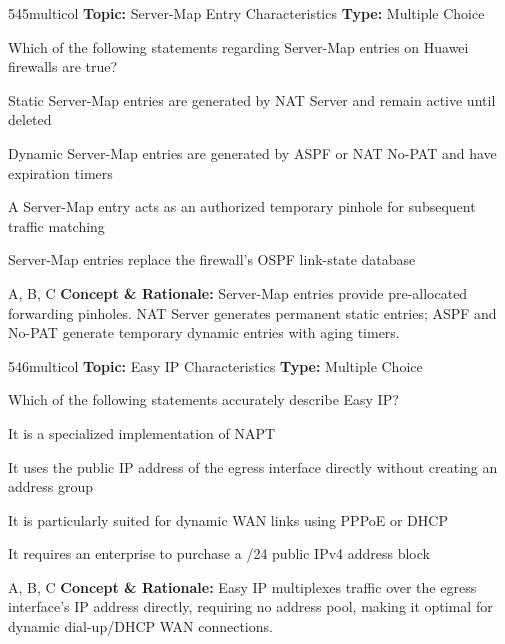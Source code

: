 \begin{qcard}{545}{multicol}
\textcolor{darkslate!75}{\small\textbf{Topic:} Server-Map Entry Characteristics \hfill \textbf{Type:} Multiple Choice}\vspace{0.4em}\par
Which of the following statements regarding Server-Map entries on Huawei firewalls are true?
\begin{qoptions}
\item Static Server-Map entries are generated by NAT Server and remain active until deleted
\item Dynamic Server-Map entries are generated by ASPF or NAT No-PAT and have expiration timers
\item A Server-Map entry acts as an authorized temporary pinhole for subsequent traffic matching
\item Server-Map entries replace the firewall's OSPF link-state database
\end{qoptions}
\end{qcard}
\nopagebreak
\begin{explainbox}{A, B, C}
\textbf{Concept \& Rationale:} Server-Map entries provide pre-allocated forwarding pinholes. NAT Server generates permanent static entries; ASPF and No-PAT generate temporary dynamic entries with aging timers.
\end{explainbox}

\begin{qcard}{546}{multicol}
\textcolor{darkslate!75}{\small\textbf{Topic:} Easy IP Characteristics \hfill \textbf{Type:} Multiple Choice}\vspace{0.4em}\par
Which of the following statements accurately describe Easy IP?
\begin{qoptions}
\item It is a specialized implementation of NAPT
\item It uses the public IP address of the egress interface directly without creating an address group
\item It is particularly suited for dynamic WAN links using PPPoE or DHCP
\item It requires an enterprise to purchase a /24 public IPv4 address block
\end{qoptions}
\end{qcard}
\nopagebreak
\begin{explainbox}{A, B, C}
\textbf{Concept \& Rationale:} Easy IP multiplexes traffic over the egress interface's IP address directly, requiring no address pool, making it optimal for dynamic dial-up/DHCP WAN connections.
\end{explainbox}

